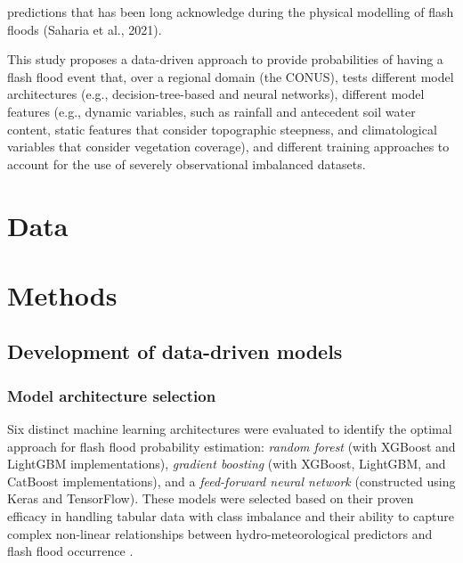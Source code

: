 predictions that has been long acknowledge during the physical modelling of flash floods (Saharia et al., 2021).

This study proposes a data-driven approach to provide probabilities of having a flash flood event that, over a regional domain (the CONUS), tests different model architectures (e.g., decision-tree-based and neural networks), different model features (e.g., dynamic variables,  such as rainfall and antecedent soil water content, static features that consider topographic steepness, and climatological variables that consider vegetation coverage), and different training approaches to account for the use of severely observational imbalanced datasets. 


\section{Data}
\label{data_driven_flash_floods_short_medium_range_data}


\section{Methods}
\label{data_driven_flash_floods_short_medium_range_methods}

\subsection{Development of data-driven models}

\subsubsection{Model architecture selection}

Six distinct machine learning architectures were evaluated to identify the optimal approach for flash flood probability estimation: \textit{random forest} (with XGBoost and LightGBM implementations), \textit{gradient boosting} (with XGBoost, LightGBM, and CatBoost implementations), and a \textit{feed-forward neural network} (constructed using Keras and TensorFlow). These models were selected based on their proven efficacy in handling tabular data with class imbalance and their ability to capture complex non-linear relationships between hydro-meteorological predictors and flash flood occurrence \citep{Shwartz-Ziv_2022}.

